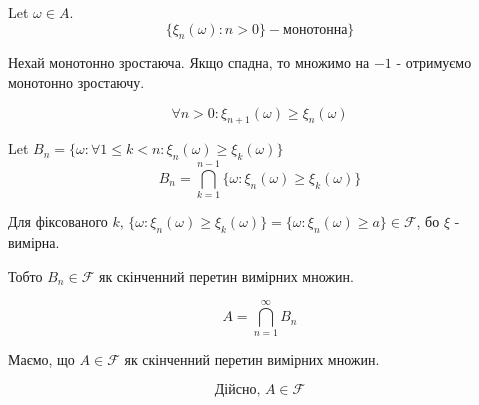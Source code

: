 \documentclass[11pt, a4paper]{article} %
\begin{document}
Let $\omega \in A$.
$$\{\xi_n(\omega) : n>0\} - \text{монотонна}\}$$

Нехай монотонно зростаюча. 
Якщо спадна, то множимо на $-1$ - отримуємо монотонно зростаючу.

$$\forall n>0: \xi_{n+1}(\omega) \ge \xi_{n}(\omega)$$

Let $B_n = \{\omega : \forall 1 \le k < n : \xi_n(\omega) \ge \xi_k(\omega) \}$
$$B_n = \bigcap_{k=1}^{n-1} \{\omega : \xi_n(\omega) \ge \xi_k(\omega) \}$$

Для фіксованого $k$, $\{\omega : \xi_n(\omega) \ge \xi_k(\omega) \} = \{\omega : \xi_n(\omega) \ge a \} \in \mathcal F$,
бо $\xi$ - вимірна.

Тобто $B_n \in \mathcal F$ як скінченний перетин вимірних множин.

$$A = \bigcap_{n=1}^{\infty} B_n$$

Маємо, що $A \in \mathcal F$ як скінченний перетин вимірних множин.

\begin{mdframed}[style=ans]
    $$\text{Дійсно, } A \in \mathcal F$$
    
\end{mdframed}
\end{document}
